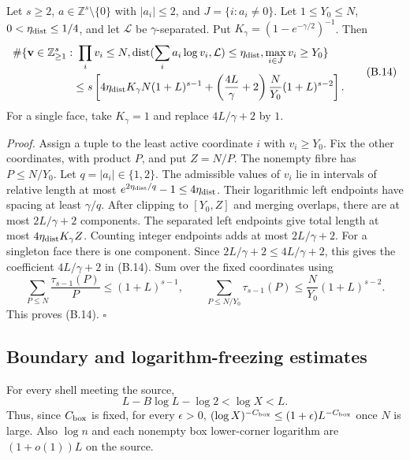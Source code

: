 \begin{lemma}\label{lem:aa37-thin-shell}
Let $s\ge2$,
$a\in\mathbb Z^s\setminus\{0\}$ with $|a_i|\le2$, and
$J=\{i:a_i\ne0\}$. Let $1\le Y_0\le N$, $0<\eta_{\rm dist}\le1/4$, and let
$\mathcal L$ be $\gamma$-separated. Put
$K_\gamma=(1-e^{-\gamma/2})^{-1}$. Then
\[
\begin{split}
 \#\{\mathbf v\in\mathbb Z_{\ge1}^s:&\ \prod_i v_i\le N,
   \operatorname{dist}(\sum_i a_i\log v_i,\mathcal L)\le\eta_{\rm dist},
   \max_{i\in J}v_i\ge Y_0\}\\
 &\le s\left[4\eta_{\rm dist} K_\gamma N(1+L)^{s-1}
   +\left(\frac{4L}{\gamma}+2\right)
      \frac N{Y_0}(1+L)^{s-2}\right].
\end{split}
 \tag{B.14}
\]
For a single face, take $K_\gamma=1$ and replace
$4L/\gamma+2$ by $1$.
\end{lemma}

\emph{Proof.} Assign a tuple to the least active coordinate $i$ with
$v_i\ge Y_0$. Fix the other coordinates, with product $P$, and put
$Z=N/P$. The nonempty fibre has $P\le N/Y_0$. Let $q=|a_i|\in\{1,2\}$. The admissible values of $v_i$ lie in
intervals of relative length at most $e^{2\eta_{\rm dist}/q}-1\le4\eta_{\rm dist}$.
Their logarithmic left endpoints have spacing at least $\gamma/q$.
After clipping to $[Y_0,Z]$ and merging overlaps, there are at most
$2L/\gamma+2$ components. The separated left endpoints give total
length at most $4\eta_{\rm dist} K_\gamma Z$. Counting integer endpoints adds
at most $2L/\gamma+2$. For a singleton face there is one component.
Since $2L/\gamma+2\le4L/\gamma+2$, this gives the coefficient
$4L/\gamma+2$ in (B.14).
Sum over the fixed coordinates using
\[
 \sum_{P\le N}\frac{\tau_{s-1}(P)}P\le(1+L)^{s-1},\qquad
 \sum_{P\le N/Y_0}\tau_{s-1}(P)
 \le\frac N{Y_0}(1+L)^{s-2}.
\]
This proves (B.14). \hfill$\square$

\subsection*{Boundary and logarithm-freezing estimates}

For every shell meeting the source,
\[
 L-B\log L-\log2<\log X<L.
 \tag{B.15}
\]
Thus, since $C_{\rm box}$ is fixed, for every $\epsilon>0$,
$(\log X)^{-C_{\rm box}}\le(1+\epsilon)L^{-C_{\rm box}}$
once $N$ is large. Also $\log n$ and each nonempty box lower-corner
logarithm are $(1+o(1))L$ on the source.

